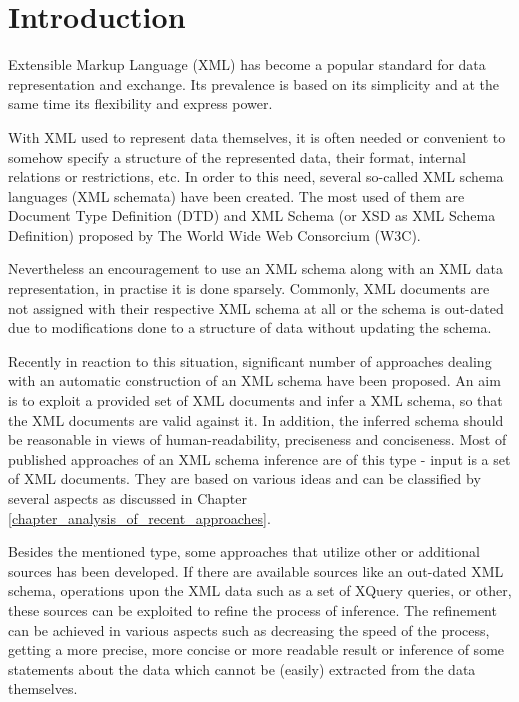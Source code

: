 \chapter{Introduction}
Extensible Markup Language (XML) \cite{Bray:08:EML} has become a popular standard for data representation and exchange. Its prevalence is based on its simplicity and at the same time its flexibility and express power.

With XML used to represent data themselves, it is often needed or convenient to somehow specify a structure of the represented data, their format, internal relations or restrictions, etc. In order to this need, several so-called XML schema languages (XML schemata) have been created. The most used of them are Document Type Definition (DTD) \cite{Bray:08:EML} and XML Schema (or XSD as XML Schema Definition) \cite{Walmsley:04:XSP, Thompson:04:XSP, Malhotra:04:XSP} proposed by The World Wide Web Consorcium (W3C).

Nevertheless an encouragement to use an XML schema along with an XML data representation, in practise it is done sparsely. Commonly, XML documents are not assigned with their respective XML schema at all or the schema is out-dated due to modifications done to a structure of data without updating the schema.

Recently in reaction to this situation, significant number of approaches dealing with an automatic construction of an XML schema have been proposed. An aim is to exploit a provided set of XML documents and infer a XML schema, so that the XML documents are valid against it. In addition, the inferred schema should be reasonable in views of human-readability, preciseness and conciseness. Most of published approaches of an XML schema inference are of this type - input is a set of XML documents. They are based on various ideas and can be classified by several aspects as discussed in Chapter \ref{chapter_analysis_of_recent_approaches}.

Besides the mentioned type, some approaches that utilize other or additional sources has been developed. If there are available sources like an out-dated XML schema, operations upon the XML data such as a set of XQuery  queries, or other, these sources can be exploited to refine the process of inference. The refinement can be achieved in various aspects such as decreasing the speed of the process, getting a more precise, more concise or more readable result or inference of some statements about the data which cannot be (easily) extracted from the data themselves.

